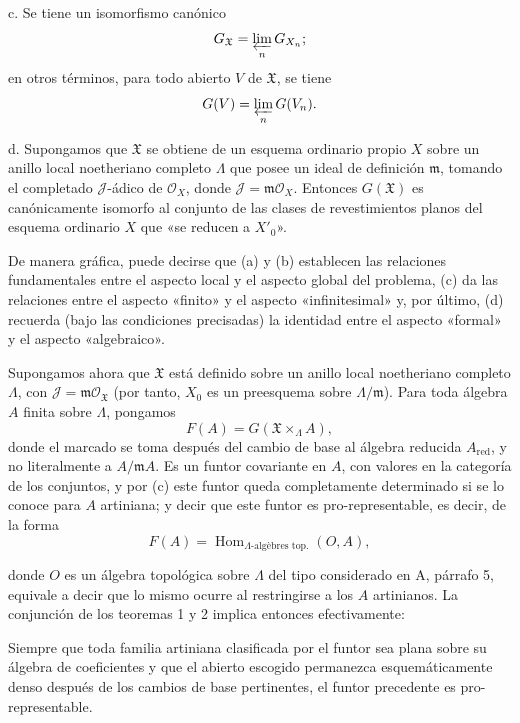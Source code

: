 \noindent c. Se tiene un isomorfismo canónico
\[
  G_{\mathfrak X}=\varprojlim_nG_{X_n} ;
\]
en otros términos, para todo abierto $V$ de $\mathfrak X$, se tiene
\[
  G(V)=\varprojlim_nG(V_n).
\]

\noindent d. Supongamos que $\mathfrak X$ se obtiene de un esquema ordinario
propio $X$ sobre un anillo local noetheriano completo $\Lambda$ que posee un
ideal de definición $\mathfrak m$, tomando el completado $\mathcal J$-ádico de
$\mathcal O_X$, donde $\mathcal J=\mathfrak m\mathcal O_X$. Entonces
$G(\mathfrak X)$ es canónicamente isomorfo al conjunto de las clases de
revestimientos planos del esquema ordinario $X$ que «se reducen a $X'_0$».

De manera gráfica, puede decirse que (a) y (b) establecen las relaciones
fundamentales entre el aspecto local y el aspecto global del problema, (c) da
las relaciones entre el aspecto «finito» y el aspecto «infinitesimal» y, por
último, (d) recuerda (bajo las condiciones precisadas) la identidad entre el
aspecto «formal» y el aspecto «algebraico».

Supongamos ahora que $\mathfrak X$ está definido sobre un anillo local
noetheriano completo $\Lambda$, con
$\mathcal J=\mathfrak m\mathcal O_{\mathfrak X}$ (por tanto, $X_0$ es un
preesquema sobre $\Lambda/\mathfrak m$). Para toda álgebra $A$ finita sobre
$\Lambda$, pongamos
\[
  F(A)=G(\mathfrak X\times_\Lambda A),
\]
donde el marcado se toma después del cambio de base al álgebra reducida $A_{\mathrm{red}}$, y no literalmente a $A/\mathfrak mA$. Es un funtor covariante en $A$, con valores en la categoría de los conjuntos,
y por (c) este funtor queda completamente determinado si se lo conoce para $A$
artiniana; y decir que este funtor es pro-representable, es decir, de la forma
\[
  F(A)=\operatorname{Hom}_{\Lambda\text{-algèbres top.}}(O,A),
\]

donde $O$ es un álgebra topológica sobre $\Lambda$ del tipo considerado en A,
párrafo 5, equivale a decir que lo mismo ocurre al restringirse a los $A$
artinianos. La conjunción de los teoremas 1 y 2 implica entonces efectivamente:

 Siempre que toda familia artiniana clasificada por el funtor sea plana sobre su álgebra de coeficientes y que el abierto escogido permanezca esquemáticamente denso después de los cambios de base pertinentes, el funtor precedente es pro-representable.

